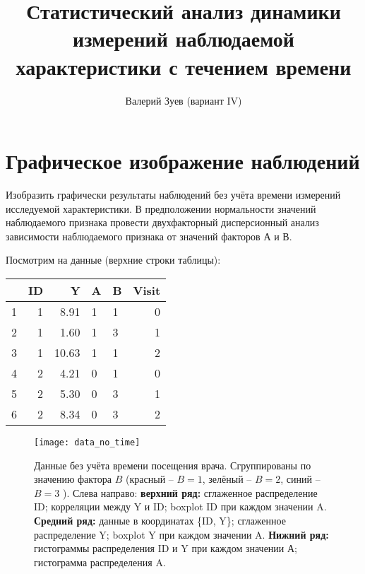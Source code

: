 \documentclass[a4paper,12pt]{article}
\begin{document}
\title{ Статистический анализ динамики измерений наблюдаемой характеристики с течением времени }
\author{Валерий Зуев (вариант IV)}
\maketitle

\setcounter{section}{1}
\section{ Графическое изображение наблюдений }

\begin{leftbar}
Изобразить графически результаты наблюдений без учёта времени измерений исследуемой характеристики.
В предположении нормальности значений наблюдаемого признака провести двухфакторный дисперсионный анализ зависимости наблюдаемого признака от значений факторов А и В.
\end{leftbar}

Посмотрим на данные (верхние строки таблицы):

\begin{table}[ht]
	\centering
	\begin{tabular}{rrrllr}
		\hline
		& ID & Y & A & B & Visit \\ 
		\hline
		1 &   1 & 8.91 & 1 & 1 &   0 \\ 
		2 &   1 & 1.60 & 1 & 3 &   1 \\ 
		3 &   1 & 10.63 & 1 & 1 &   2 \\ 
		4 &   2 & 4.21 & 0 & 1 &   0 \\ 
		5 &   2 & 5.30 & 0 & 3 &   1 \\ 
		6 &   2 & 8.34 & 0 & 3 &   2 \\ 
		\hline
	\end{tabular}
\end{table}

\begin{figure}[H]
	\label{img:data_no_time}
	\texttt{[image: data\_no\_time]}
	\caption{ 
		Данные без учёта времени посещения врача.
		Сгруппированы по значению фактора $ B $ (красный -- $ B = 1 $, зелёный -- $ B = 2 $, синий -- $ B = 3 $ ).
		Слева направо: \textbf{верхний ряд:} сглаженное распределение ID; корреляции между Y и ID; boxplot ID при каждом значении A.
		\textbf{Средний ряд:} данные в координатах \{ID, Y\}; сглаженное распределение Y; boxplot Y при каждом значении A.
		\textbf{Нижний ряд:} гистограммы распределения  ID  и Y при каждом значении А; гистограмма распределения A.
	}
\end{figure}
\end{document}
